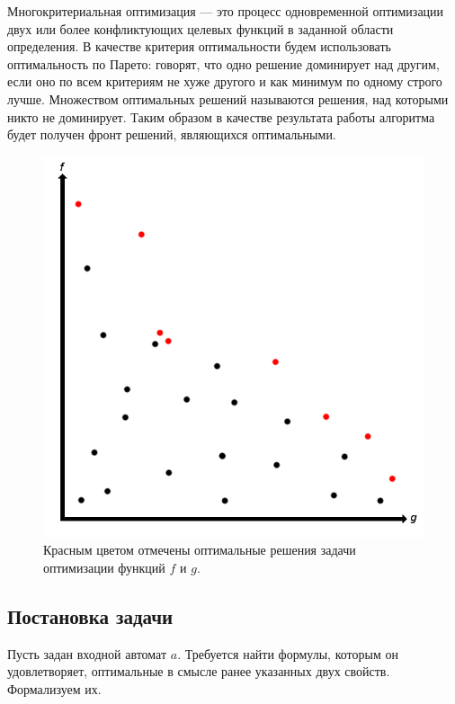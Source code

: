 \documentclass[12pt,fleqn]{article}
\begin{document}
Многокритериальная оптимизация --- это процесс одновременной оптимизации двух или более конфликтующих целевых функций
в заданной области определения. В качестве критерия оптимальности будем использовать оптимальность по Парето:
говорят, что одно решение доминирует над другим, если оно по всем критериям не хуже другого и как минимум по одному
строго лучше. Множеством оптимальных решений называются решения, над которыми никто не доминирует. Таким образом
в качестве результата работы алгоритма будет получен фронт решений, являющихся оптимальными.

\FloatBarrier

\begin{figure}[!h]
  \centering
    \includegraphics[scale=0.3]{opt.png}
  \caption{Красным цветом отмечены оптимальные решения задачи оптимизации функций $f$ и $g$.}
\end{figure}

\FloatBarrier

\subsection{Постановка задачи}

Пусть задан входной автомат $a$. Требуется найти формулы, которым он удовлетворяет, оптимальные в смысле ранее указанных
двух свойств. Формализуем их.
\end{document}
